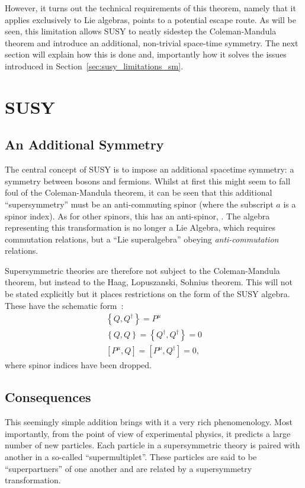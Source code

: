 However, it turns out the technical requirements of this theorem, namely that it
applies exclusively to Lie algebras, points to a potential escape route. As will
be seen, this limitation allows \acl{SUSY} to neatly sidestep the
Coleman-Mandula theorem and introduce an additional, non-trivial space-time
symmetry. The next section will explain how this is done and, importantly how it
solves the issues introduced in Section~\ref{sec:susy_limitations_sm}.

\section{\acl{SUSY}}
\subsection{An Additional Symmetry}
The central concept of \ac{SUSY} is to impose an additional spacetime symmetry:
a symmetry between bosons and fermions. Whilst at first this might seem to fall
foul of the Coleman-Mandula theorem, it can be seen that this additional
``supersymmetry'' must be an anti-commuting spinor \Qa (where the subscript $a$
is a spinor index). As for other spinors, this has an anti-spinor, \AQa. The
algebra representing this transformation is no longer a Lie Algebra, which
requires commutation relations, but a ``Lie superalgebra'' obeying
\emph{anti-commutation} relations.

Supersymmetric theories are therefore not subject to the Coleman-Mandula
theorem, but instead to the Haag, Lopuszanski, Sohnius theorem. This will not be
stated explicitly but it places restrictions on the form of the \ac{SUSY}
algebra. These have the schematic form~\cite{susy_primer}:
\begin{eqnarray}
\label{eqn:susy_commutator}
\left\{Q,Q^{\dagger}\right\} = P^{\mu}\\
\left\{Q,Q\right\} = \left\{Q^{\dagger}, Q^{\dagger}\right\} = 0\\
\left[P^{\mu}, Q\right] = \left[P^{\mu}, Q^{\dagger}\right] = 0,
\end{eqnarray}
where spinor indices have been dropped.

\subsection{Consequences}
\label{sec:consequences}
This seemingly simple addition brings with it a very rich phenomenology. Most
importantly, from the point of view of experimental physics, it predicts a large
number of new particles. Each particle in a supersymmetric theory is paired with
another in a so-called ``supermultiplet''. These particles are said to be
``superpartners'' of one another and are related by a supersymmetry
transformation.

